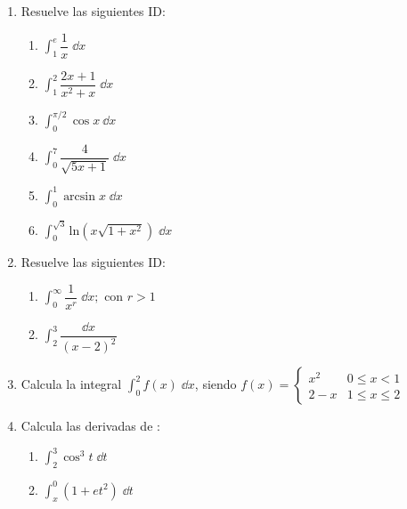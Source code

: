 \begin{enumerate} 
\item Resuelve las siguientes ID:

\begin{multicols}{2}
\begin{enumerate}
\item $\displaystyle \int_1^e \dfrac 1 x \; \dd x$
\item $\displaystyle \int_1^2 \dfrac{2x+1}{x^2+x}\; \dd x$
\item $\displaystyle \int_0^{\pi/2} \cos x \: \dd x$
\item $\displaystyle \int_0^7 \dfrac {4}{\sqrt{5x+1}}\; \dd x$
\item $\displaystyle \int_0^1 \arcsin x \; \dd x $
\item $\displaystyle \int_0^{\sqrt{3}} \mathrm{ln} \left(x \sqrt{1+x^2} \right) \; \dd x$
\end{enumerate}	
\end{multicols}



\item Resuelve las siguientes ID:

\begin{multicols}{2}
\begin{enumerate}
\item $\displaystyle \int_0^{\infty} \dfrac {1}{x^r}\; \dd x; \text { con } r>1$
\item $\displaystyle \int_2^3 \dfrac {\dd x}{(x-2)^2}  $
\end{enumerate}	
\end{multicols}

\item Calcula	la integral $\displaystyle \int_0^2 f(x)\; \dd x$, siendo $f(x)=\begin{cases}
	x^2 & 0\le x < 1 \\
	2-x & 1\le x \le 2
	\end{cases}$

\rightline{\textcolor{gris}{Solución: $5/6$}}

\item Calcula las derivadas de :
\begin{multicols}{2}
\begin{enumerate}
\item $\displaystyle \int_2^3 \cos^3 t \; \dd t$
\item $\displaystyle \int_x^0 (1+et^2)\; \dd t$
\end{enumerate}	
\end{multicols}


\end{enumerate}
